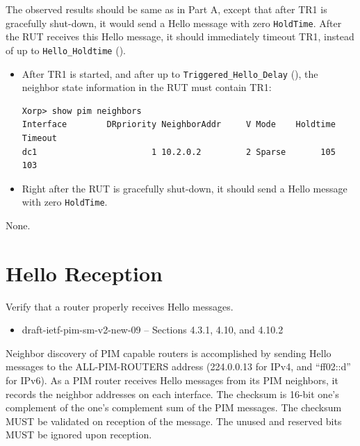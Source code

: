 \documentclass[11pt]{report}
\begin{document}

The observed results should be same as in Part A, except that after TR1 is
gracefully shut-down, it would send a Hello message with zero \verb=HoldTime=.
After the RUT receives this Hello message, it should immediately timeout TR1,
instead of up to  \verb=Hello_Holdtime= ({\PimsmHelloHoldtime}).


\begin{itemize}

  \item After TR1 is started, and after up to \verb=Triggered_Hello_Delay=
        ({\PimsmTriggeredHelloDelay}), the neighbor state information in the
        RUT must contain TR1:

\begin{verbatim}
Xorp> show pim neighbors 
Interface        DRpriority NeighborAddr     V Mode    Holdtime Timeout
dc1                       1 10.2.0.2         2 Sparse       105     103
\end{verbatim}

  \item Right after the RUT is gracefully shut-down, it should send
        a Hello message with zero \verb=HoldTime=.

\end{itemize}

None.

\newpage
\section{Hello Reception}

Verify that a router properly receives Hello messages.

\begin{itemize}
  \item draft-ietf-pim-sm-v2-new-09 -- Sections 4.3.1, 4.10, and 4.10.2
\end{itemize}

Neighbor discovery of PIM capable routers is accomplished by sending Hello
messages to the ALL-PIM-ROUTERS address (224.0.0.13 for IPv4,
and ``ff02::d'' for IPv6). As a PIM router receives Hello messages from its
PIM neighbors, it records the neighbor addresses on each interface.
The checksum is 16-bit one's complement of the one's complement sum of the PIM
messages. The checksum MUST be validated on reception of the message.
The unused and reserved bits MUST be ignored upon reception.
\end{document}
